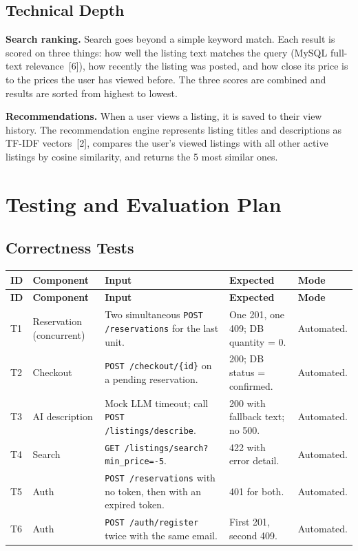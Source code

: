 \documentclass[11pt]{article}
\begin{document}
\subsection*{Technical Depth}
\textbf{Search ranking.} Search goes beyond a simple keyword match. Each result is scored on three
things: how well the listing text matches the query (MySQL full-text relevance~[6]), how recently the
listing was posted, and how close its price is to the prices the user has viewed before. The three
scores are combined and results are sorted from highest to lowest.

\textbf{Recommendations.} When a user views a listing, it is saved to their view history. The
recommendation engine represents listing titles and descriptions as TF-IDF vectors~[2], compares the
user's viewed listings with all other active listings by cosine similarity, and returns the 5 most
similar ones.

\section{Testing and Evaluation Plan}
\subsection*{Correctness Tests}
{\small
\begin{xltabular}{\linewidth}{@{}P{0.6cm}P{2.4cm}P{4.6cm}LP{1.7cm}@{}}
\toprule
\textbf{ID} & \textbf{Component} & \textbf{Input} & \textbf{Expected} & \textbf{Mode} \\
\midrule
\endfirsthead
\toprule
\textbf{ID} & \textbf{Component} & \textbf{Input} & \textbf{Expected} & \textbf{Mode} \\
\midrule
\endhead
T1 & Reservation (concurrent) & Two simultaneous \texttt{POST /reservations} for the last unit. & One 201, one 409; DB quantity = 0. & Automated. \\
T2 & Checkout & \texttt{POST /checkout/\{id\}} on a pending reservation. & 200; DB status = confirmed. & Automated. \\
T3 & AI description & Mock LLM timeout; call \texttt{POST /listings/describe}. & 200 with fallback text; no 500. & Automated. \\
T4 & Search & \texttt{GET /listings/search?min\_price=-5}. & 422 with error detail. & Automated. \\
T5 & Auth & \texttt{POST /reservations} with no token, then with an expired token. & 401 for both. & Automated. \\
T6 & Auth & \texttt{POST /auth/register} twice with the same email. & First 201, second 409. & Automated. \\
\bottomrule
\end{xltabular}}
\end{document}
